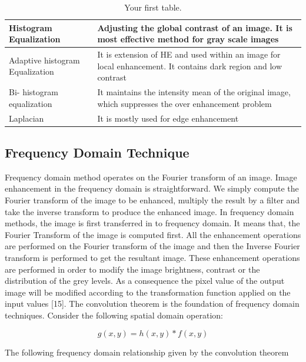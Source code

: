 \begin{table}[h!]
	\begin{center}
	\caption{Your first table.}
    \label{tab:table1}
	\begin{tabular}{ | m{4cm} | m{8cm}| }
	\hline
		Histogram Equalization & Adjusting the global contrast of an image. It is most effective method for gray scale images \\
	\hline
		Adaptive histogram Equalization & It is extension of HE and used within an image for local enhancement. It contains dark region and low contrast \\ 
	\hline
		Bi- histogram equalization & It maintains the intensity mean of the original image, which suppresses the over enhancement problem \\ 
	\hline
		Laplacian & It is mostly used for edge enhancement \\ 
	\hline
	\end{tabular}
	\end{center}

\end{table}

\subsection{Frequency Domain Technique}
Frequency domain method operates on the Fourier transform of an image. Image enhancement in the frequency domain is straightforward. We simply compute the Fourier transform of the image to be enhanced, multiply the result by a filter and take the inverse transform to produce the enhanced image. In frequency domain methods, the image is first transferred in to frequency domain. It means that, the Fourier Transform of the image is computed first. All the enhancement operations are performed on the Fourier transform of the image and then the Inverse Fourier transform is performed to get the resultant image. These enhancement operations are performed in order to modify the image brightness, contrast or the distribution of the grey levels. As a consequence the pixel value of the output image will be modified according to the transformation function applied on the input values [15]. The convolution theorem is the foundation of frequency domain techniques. Consider the following spatial domain operation:

\begin{equation}
	g(x,y)=h(x,y)*f(x,y)
\end{equation}

The following frequency domain relationship given by the convolution theorem 

